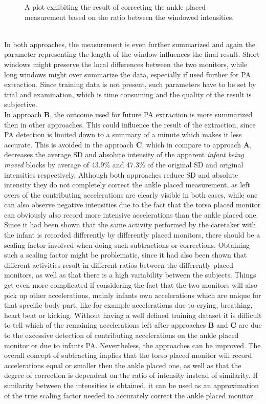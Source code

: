 \documentclass{article}
\begin{document}
{\begin{figure}[h]
\caption{A plot exhibiting the result of correcting the ankle placed measurement based on the ratio between the windowed intensities.}
\end{figure}
\\
In both approaches, the measurement is even further summarized and again the parameter representing the length of the window influences the final result. Short windows might preserve the local differences between the two monitors, while long windows might over summarize the data, especially if used further for PA extraction. Since training data is not present, such parameters have to be set by trial and examination, which is time consuming and the quality of the result is subjective. \\
In approach \textbf{B}, the outcome used for future PA extraction is more summarized then in other approaches.
This could influence the result of the extraction, since PA detection is limited down to a summary of a minute which makes it less accurate. This is avoided in the approach \textbf{C}, which in compare to approach \textbf{A}, decreases the average SD and absolute intensity of the apparent \textit{infant being moved} blocks by average of 43.9\% and 47.3\% of the original SD and original intensities respectively. Although both approaches reduce SD and absolute intensity they do not completely correct the ankle placed measurement, as left overs of the contributing accelerations are clearly visible in both cases, while one can also observe negative intensities due to the fact that the torso placed monitor can obviously also record more intensive accelerations than the ankle placed one. Since it had been shown that the same activity performed by the caretaker with the infant is recorded differently by differently placed monitors, there should be a scaling factor involved when doing such subtractions or corrections. Obtaining such a scaling factor might be problematic, since it had also been shown that different activities result in different ratios between the differently placed monitors, as well as that there is a high variability between the subjects. Things get even more complicated if considering the fact that the two monitors will also pick up other accelerations, mainly infants own accelerations which are unique for that specific body part, like for example accelerations due to crying, breathing, heart beat or kicking. Without having a well defined training dataset it is difficult to tell which of the remaining accelerations left after approaches \textbf{B} and \textbf{C} are due to the excessive detection of contributing accelerations on the ankle placed monitor or due to infants PA. Nevertheless, the approaches can be improved. The overall concept of subtracting implies that the torso placed monitor will record accelerations equal or smaller then the ankle placed one, as well as that the degree of correction is dependent on the ratio of intensity instead of similarity. If similarity between the intensities is obtained, it can be used as an approximation of the true scaling factor needed to accurately correct the ankle placed monitor. \\
}
\end{document}
